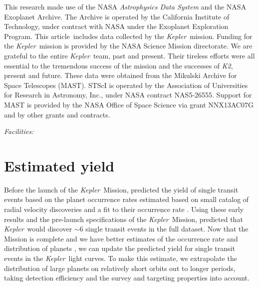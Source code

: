 \documentclass[12pt,preprint]{aastex}
\newcommand{\project}[1]{\textsl{#1}}
\newcommand{\kepler}{\project{Kepler}}
\newcommand{\KT}{\project{K2}}
\newcommand{\paper}{article}
\newcommand{\sectlabel}[1]{\label{sect:#1}}
\begin{document}
This research made use of the NASA \project{Astrophysics Data System} and the
NASA Exoplanet Archive.
The Archive is operated by the California Institute of Technology, under
contract with NASA under the Exoplanet Exploration Program.
This \paper\ includes data collected by the \kepler\ mission. Funding for the
\kepler\ mission is provided by the NASA Science Mission directorate.
We are grateful to the entire \kepler\ team, past and present.
Their tireless efforts were all essential to the tremendous success of the mission
and the successes of \KT, present and future.
These data were obtained from the Mikulski Archive for Space Telescopes
(MAST).
STScI is operated by the Association of Universities for Research in
Astronomy, Inc., under NASA contract NAS5-26555.
Support for MAST is provided by the NASA Office of Space Science via grant
NNX13AC07G and by other grants and contracts.

{\it Facilities:} 

\appendix

\section{Estimated yield}\sectlabel{est}

Before the launch of the \kepler\ Mission, \citet{Yee:2008} predicted the
yield of single transit events based on the planet occurrence rates estimated
based on small catalog of radial velocity discoveries \citep{Butler:2006} and
a fit to their occurrence rate \citep{Cumming:2008}.
Using these early results and the pre-launch specifications of the \kepler\
Mission, \citet{Yee:2008} predicted that \kepler\ would discover $\sim 6$
single transit events in the full dataset.
Now that the Mission is complete and we have better estimates of the
occurrence rate and distribution of planets \citep[for example][]{Dong:2013,
Petigura:2013, Foreman-Mackey:2014, Dressing:2015}, we can update the
predicted yield for single transit events in the \kepler\ light curves.
To make this estimate, we extrapolate the distribution of large planets on
relatively short orbits out to longer periods, taking detection efficiency
and the survey and targeting properties into account.
\end{document}
